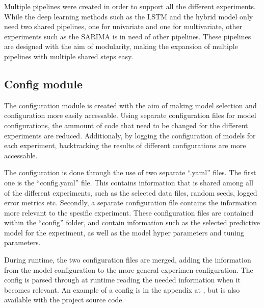

Multiple pipelines were created in order to support all the different experiments.
While the deep learning methods such as the LSTM and the hybrid model only need two shared pipelines,
one for univariate and one for multivariate,
other experiments such as the SARIMA is in need of other pipelines.
These pipelines are designed with the aim of modularity,
making the expansion of multiple pipelines with multiple shared steps easy.




\subsection{Config module}
The configuration module is created with the aim of making model selection and configuration more easily accessable.
Using separate configuration files for model configurations,
the ammount of code that need to be changed for the different experiments are reduced.
Additionaly, by logging the configuration of models for each experiment,
backtracking the results of different configurations are more accessable.

The configuration is done through the use of two separate ``.yaml'' files.
The first one is the ``config.yaml'' file.
This contains information that is shared among all of the different experiments,
such as the selected data files, random seeds, logged error metrics etc.
Secondly, a separate configuration file contains the information more relevant to the spesific experiment.
These configuration files are contained within the ``config'' folder,
and contain information such as the selected predictive model for the experiment,
as well as the model hyper parameters and tuning parameters. 

During runtime, the two configuration files are merged, adding the information from the model configuration to the more general experimen configuration.
The config is parsed through at runtime reading the needed information when it becomes relevant.
An example of a config is in the appendix at , but is also available with the project source code.


